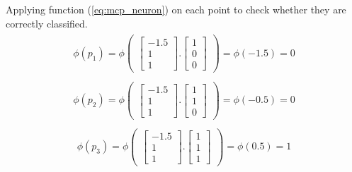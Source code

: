 Applying function (\ref{eq:mcp_neuron}) on each point to check whether they are correctly classified.
\begin{align}
  \nonumber
  \begin{matrix}
    \phi(p_1) = \phi\begin{pmatrix}
      \begin{bmatrix}
        -1.5 \\
        1 \\
        1 
      \end{bmatrix}.\begin{bmatrix}
        1 \\
        0 \\
        0
      \end{bmatrix}
    \end{pmatrix} = \phi(-1.5) = 0 
  \end{matrix}
\end{align}
\begin{align}
  \nonumber
  \begin{matrix}
    \phi(p_2) = \phi\begin{pmatrix}
      \begin{bmatrix}
        -1.5 \\
        1 \\
        1 
      \end{bmatrix}.\begin{bmatrix}
        1 \\
        1 \\
        0
      \end{bmatrix}
    \end{pmatrix} = \phi(-0.5) = 0
  \end{matrix}
\end{align}
\begin{align}
  \nonumber
  \begin{matrix}
    \phi(p_3) = \phi\begin{pmatrix}
      \begin{bmatrix}
        -1.5 \\
        1 \\
        1 
      \end{bmatrix}.\begin{bmatrix}
        1 \\
        1 \\
        1
      \end{bmatrix}
    \end{pmatrix} = \phi(0.5) = 1
  \end{matrix}
\end{align}
